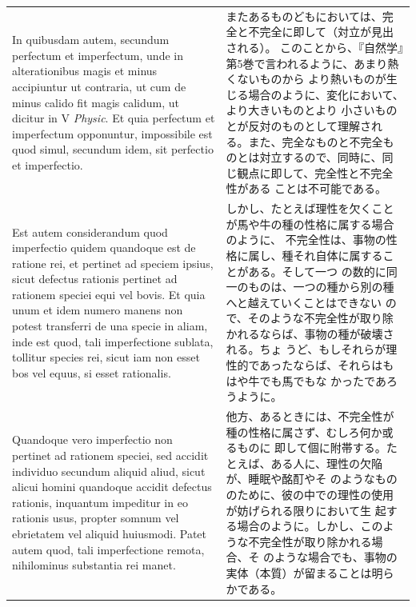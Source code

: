 \documentclass[paper=a4paper,fontsize=10pt,jafontsize=9pt,titlepage]{jlreq}
\begin{document}
\begin{longtable}{p{21em}p{21em}}
 In quibusdam autem, secundum perfectum et imperfectum, unde in
 alterationibus magis et minus accipiuntur ut contraria, ut cum de
 minus calido fit magis calidum, ut dicitur in V {\itshape Physic}. Et
 quia perfectum et imperfectum opponuntur, impossibile est quod simul,
 secundum idem, sit perfectio et imperfectio.
 
&

 またあるものどもにおいては、完全と不完全に即して（対立が見出される）。
 このことから、『自然学』第5巻で言われるように、あまり熱くないものから
 より熱いものが生じる場合のように、変化において、より大きいものとより
 小さいものとが反対のものとして理解される。また、完全なものと不完全も
 のとは対立するので、同時に、同じ観点に即して、完全性と不完全性がある
 ことは不可能である。

\\


 Est autem considerandum quod imperfectio quidem quandoque est de
 ratione rei, et pertinet ad speciem ipsius, sicut defectus rationis
 pertinet ad rationem speciei equi vel bovis. Et quia unum et idem
 numero manens non potest transferri de una specie in aliam, inde est
 quod, tali imperfectione sublata, tollitur species rei, sicut iam non
 esset bos vel equus, si esset rationalis.
 
&

 しかし、たとえば理性を欠くことが馬や牛の種の性格に属する場合のように、
 不完全性は、事物の性格に属し、種それ自体に属することがある。そして一つ
 の数的に同一のものは、一つの種から別の種へと越えていくことはできない
 ので、そのような不完全性が取り除かれるならば、事物の種が破壊される。ちょ
 うど、もしそれらが理性的であったならば、それらはもはや牛でも馬でもな
 かったであろうように。

\\



 Quandoque vero imperfectio non pertinet ad rationem speciei, sed
 accidit individuo secundum aliquid aliud, sicut alicui homini
 quandoque accidit defectus rationis, inquantum impeditur in eo
 rationis usus, propter somnum vel ebrietatem vel aliquid
 huiusmodi. Patet autem quod, tali imperfectione remota, nihilominus
 substantia rei manet.
 
&

 他方、あるときには、不完全性が種の性格に属さず、むしろ何か或るものに
 即して個に附帯する。たとえば、ある人に、理性の欠陥が、睡眠や酩酊やそ
 のようなもののために、彼の中での理性の使用が妨げられる限りにおいて生
 起する場合のように。しかし、このような不完全性が取り除かれる場合、そ
 のような場合でも、事物の実体（本質）が留まることは明らかである。


\end{longtable}
\end{document}
